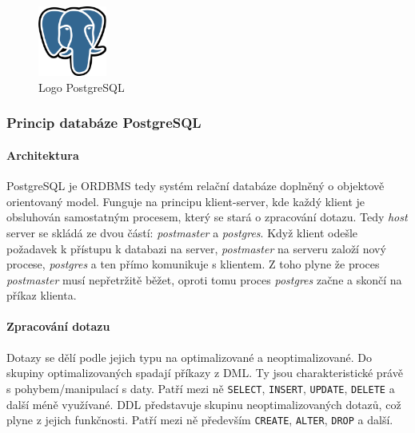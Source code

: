 \documentclass[a4paper,12pt]{report}
\begin{document}
\begin{figure}[h!]
    \centering
    \includegraphics[width=0.2\textwidth]{./img/implementace/postgresql.png}
    \caption[Logo PostgreSQL]{\centering Logo PostgreSQL }
 \end{figure}   


\subsubsection{Princip databáze PostgreSQL}
\paragraph*{Architektura}
PostgreSQL je \ac{ORDBMS} tedy systém relační databáze doplněný o objektově orientovaný model. Funguje na principu klient-server, kde každý klient je obsluhován samostatným procesem, který se stará o zpracování dotazu. Tedy \textit{host} server se skládá ze dvou částí: \textit{postmaster} a \textit{postgres}.  Když klient odešle požadavek k přístupu k databazi na server, \textit{postmaster} na serveru založí nový procese, \textit{postgres} a ten přímo komunikuje s klientem. Z toho plyne že proces \textit{postmaster} musí nepřetržitě běžet, oproti tomu  proces \textit{postgres} začne a skončí na příkaz klienta. 


\paragraph*{Zpracování dotazu}
Dotazy se dělí podle jejich typu na optimalizované a neoptimalizované. Do skupiny optimalizovaných spadají příkazy z \ac{DML}. Ty jsou charakteristické právě s pohybem/manipulací s daty. Patří mezi ně \texttt{SELECT}, \texttt{INSERT}, \texttt{UPDATE}, \texttt{DELETE} a další méně využívané. \ac{DDL}  představuje skupinu neoptimalizovaných dotazů, což plyne z jejich funkčnosti. Patří mezi ně především \texttt{CREATE}, \texttt{ALTER}, \texttt{DROP} a další. \cite{bares}
\end{document}
